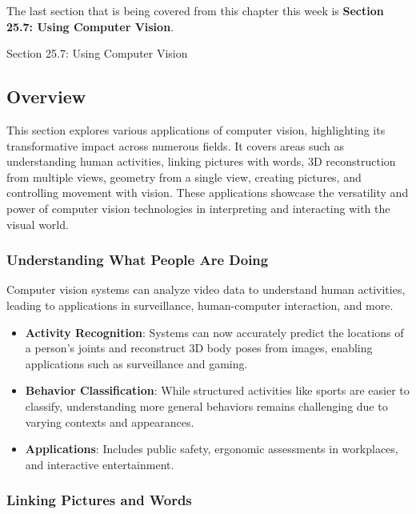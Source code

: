 The last section that is being covered from this chapter this week is \textbf{Section 25.7: Using Computer Vision}.

\begin{notes}{Section 25.7: Using Computer Vision}
    \subsection*{Overview}

    This section explores various applications of computer vision, highlighting its transformative impact across numerous fields. It covers areas such as understanding human activities, linking pictures with 
    words, 3D reconstruction from multiple views, geometry from a single view, creating pictures, and controlling movement with vision. These applications showcase the versatility and power of computer vision 
    technologies in interpreting and interacting with the visual world.
    
    \subsubsection*{Understanding What People Are Doing}
    
    Computer vision systems can analyze video data to understand human activities, leading to applications in surveillance, human-computer interaction, and more.
    
    \begin{highlight}
    
        \begin{itemize}
            \item \textbf{Activity Recognition}: Systems can now accurately predict the locations of a person’s joints and reconstruct 3D body poses from images, enabling applications such as surveillance and 
            gaming.
            \item \textbf{Behavior Classification}: While structured activities like sports are easier to classify, understanding more general behaviors remains challenging due to varying contexts and appearances.
            \item \textbf{Applications}: Includes public safety, ergonomic assessments in workplaces, and interactive entertainment.
        \end{itemize}
    
    \end{highlight}
    
    \subsubsection*{Linking Pictures and Words}
    

\end{notes}
